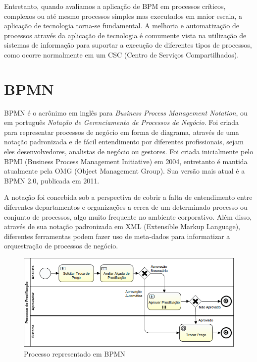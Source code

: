 Entretanto, quando avaliamos a aplicação de BPM em processos críticos, complexos ou até mesmo processos simples mas executados em maior escala, a aplicação de tecnologia torna-se fundamental. A melhoria e automatização de processos através da aplicação de tecnologia é comumente vista na utilização de sistemas de informação para suportar a execução de diferentes tipos de processos, como ocorre normalmente em um CSC\cite{csc} (Centro de Serviços Compartilhados).


\section{BPMN}\label{sec:bpm-bpmn}
BPMN\cite{bpmn} é o acrônimo em inglês para \textit{Business Process Management Notation}, ou em português \textit{Notação de Gerenciamento de Processos de Negócio}. Foi criada para representar processos de negócio em forma de diagrama, através de uma notação padronizada e de fácil entendimento por diferentes profissionais, sejam eles desenvolvedores, analistas de negócio ou gestores. Foi criada inicialmente pelo BPMI\cite{bpmi} (Business Process Management Initiative) em 2004, entretanto é mantida atualmente pela OMG\cite{omg} (Object Management Group). Sua versão mais atual é a BPMN 2.0\cite{bpmn20}, publicada em 2011.

A notação foi concebida sob a perspectiva de cobrir a falta de entendimento entre diferentes departamentos e organizações a cerca de um determinado processo ou conjunto de processos, algo muito frequente no ambiente corporativo. Além disso, através de sua notação padronizada em XML\cite{xml} (Extensible Markup Language), diferentes ferramentas podem fazer uso de meta-dados para informatizar a orquestração de processos de negócio.



\begin{figure}[H]
  \centering
  \includegraphics[width=1.0\textwidth]{imagens/ProcessoDePrecificacao.png}
  \caption{Processo representado em BPMN}
  \label{fig:exemplo_bpmn}
\end{figure}

